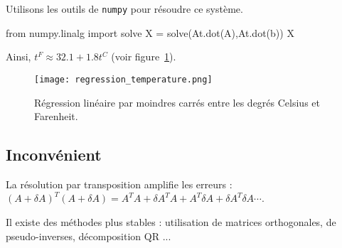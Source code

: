 Utilisons les outils de \texttt{numpy} pour résoudre ce système. 
\begin{pyconsole}
from numpy.linalg import solve
X = solve(At.dot(A),At.dot(b))
X
\end{pyconsole}
Ainsi, $t^F \approx 32.1+1.8 t^C$ (voir figure~\ref{13systeme:fig:regression_temperature}).

\begin{figure}[!h]
\begin{center}
  \texttt{[image: regression\_temperature.png]}
  \caption{Régression linéaire par moindres carrés entre les degrés Celsius et Farenheit.}
  \label{13systeme:fig:regression_temperature}
\end{center}
\end{figure}
\subsection{Inconvénient}

La résolution par transposition amplifie les erreurs : $(A+\delta A)^T(A+\delta A)=A^TA+\delta 
A^TA+A^T\delta A+\delta A^T\delta A \cdots$.

Il existe des méthodes plus stables : utilisation de matrices orthogonales, de pseudo-inverses, 
décomposition QR ...

